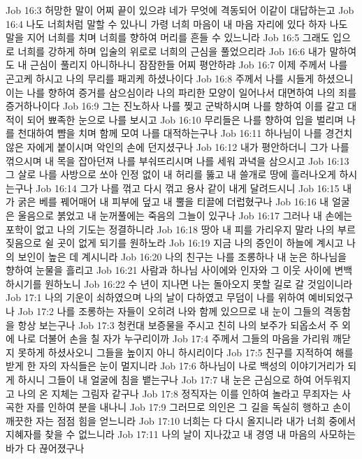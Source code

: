 Job 16:3  허망한 말이 어찌 끝이 있으랴 네가 무엇에 격동되어 이같이 대답하는고
Job 16:4  나도 너희처럼 말할 수 있나니 가령 너희 마음이 내 마음 자리에 있다 하자 나도 말을 지어 너희를 치며 너희를 향하여 머리를 흔들 수 있느니라
Job 16:5  그래도 입으로 너희를 강하게 하며 입술의 위로로 너희의 근심을 풀었으리라
Job 16:6  내가 말하여도 내 근심이 풀리지 아니하나니 잠잠한들 어찌 평안하랴
Job 16:7  이제 주께서 나를 곤고케 하시고 나의 무리를 패괴케 하셨나이다
Job 16:8  주께서 나를 시들게 하셨으니 이는 나를 향하여 증거를 삼으심이라 나의 파리한 모양이 일어나서 대면하여 나의 죄를 증거하나이다
Job 16:9  그는 진노하사 나를 찢고 군박하시며 나를 향하여 이를 갈고 대적이 되어 뾰족한 눈으로 나를 보시고
Job 16:10  무리들은 나를 향하여 입을 벌리며 나를 천대하여 뺨을 치며 함께 모여 나를 대적하는구나
Job 16:11  하나님이 나를 경건치 않은 자에게 붙이시며 악인의 손에 던지셨구나
Job 16:12  내가 평안하더니 그가 나를 꺾으시며 내 목을 잡아던져 나를 부숴뜨리시며 나를 세워 과녁을 삼으시고
Job 16:13  그 살로 나를 사방으로 쏘아 인정 없이 내 허리를 뚫고 내 쓸개로 땅에 흘러나오게 하시는구나
Job 16:14  그가 나를 꺾고 다시 꺾고 용사 같이 내게 달려드시니
Job 16:15  내가 굵은 베를 꿰어매어 내 피부에 덮고 내 뿔을 티끌에 더럽혔구나
Job 16:16  내 얼굴은 울음으로 붉었고 내 눈꺼풀에는 죽음의 그늘이 있구나
Job 16:17  그러나 내 손에는 포학이 없고 나의 기도는 정결하니라
Job 16:18  땅아 내 피를 가리우지 말라 나의 부르짖음으로 쉴 곳이 없게 되기를 원하노라
Job 16:19  지금 나의 증인이 하늘에 계시고 나의 보인이 높은 데 계시니라
Job 16:20  나의 친구는 나를 조롱하나 내 눈은 하나님을 향하여 눈물을 흘리고
Job 16:21  사람과 하나님 사이에와 인자와 그 이웃 사이에 변백하시기를 원하노니
Job 16:22  수 년이 지나면 나는 돌아오지 못할 길로 갈 것임이니라
Job 17:1  나의 기운이 쇠하였으며 나의 날이 다하였고 무덤이 나를 위하여 예비되었구나
Job 17:2  나를 조롱하는 자들이 오히려 나와 함께 있으므로 내 눈이 그들의 격동함을 항상 보는구나
Job 17:3  청컨대 보증물을 주시고 친히 나의 보주가 되옵소서 주 외에 나로 더불어 손을 칠 자가 누구리이까
Job 17:4  주께서 그들의 마음을 가리워 깨닫지 못하게 하셨사오니 그들을 높이지 아니 하시리이다
Job 17:5  친구를 지적하여 해를 받게 한 자의 자식들은 눈이 멀지니라
Job 17:6  하나님이 나로 백성의 이야기거리가 되게 하시니 그들이 내 얼굴에 침을 뱉는구나
Job 17:7  내 눈은 근심으로 하여 어두워지고 나의 온 지체는 그림자 같구나
Job 17:8  정직자는 이를 인하여 놀라고 무죄자는 사곡한 자를 인하여 분을 내나니
Job 17:9  그러므로 의인은 그 길을 독실히 행하고 손이 깨끗한 자는 점점 힘을 얻느니라
Job 17:10  너희는 다 다시 올지니라 내가 너희 중에서 지혜자를 찾을 수 없느니라
Job 17:11  나의 날이 지나갔고 내 경영 내 마음의 사모하는 바가 다 끊어졌구나
